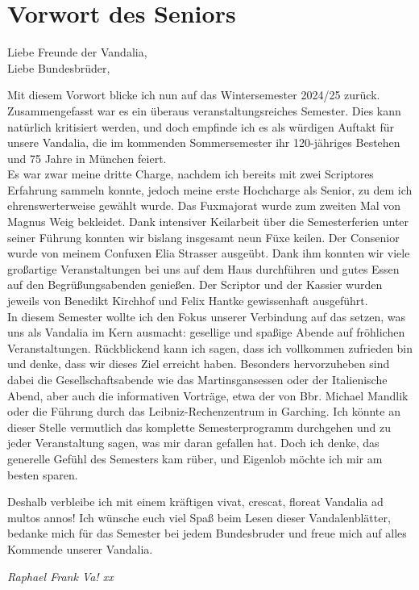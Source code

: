 \section{Vorwort des Seniors}

Liebe Freunde der Vandalia,\\
Liebe Bundesbrüder,
\begin{multicols}{2}

Mit diesem Vorwort blicke ich nun auf das Wintersemester 2024/25 zurück. Zusammengefasst
war es ein überaus veranstaltungsreiches Semester. Dies kann natürlich
kritisiert werden, und doch empfinde ich es als würdigen Auftakt für unsere
Vandalia, die im kommenden Sommersemester ihr 120-jähriges Bestehen und 75
Jahre in München feiert.\\
Es war zwar meine dritte Charge, nachdem ich bereits mit zwei Scriptores Erfahrung sammeln
konnte, jedoch meine erste Hochcharge als Senior, zu dem ich ehrenswerterweise
gewählt wurde. Das Fuxmajorat wurde zum zweiten Mal von Magnus Weig bekleidet.
Dank intensiver Keilarbeit über die Semesterferien unter seiner Führung konnten
wir bislang insgesamt neun Füxe keilen. Der Consenior wurde von meinem Confuxen
Elia Strasser ausgeübt. Dank ihm konnten wir viele großartige Veranstaltungen
bei uns auf dem Haus durchführen und gutes Essen auf den Begrüßungsabenden
genießen. Der Scriptor und der Kassier wurden jeweils von Benedikt Kirchhof und
Felix Hantke gewissenhaft ausgeführt.\\
In diesem
Semester wollte ich den Fokus unserer Verbindung auf das setzen, was uns als
Vandalia im Kern ausmacht: gesellige und spaßige Abende auf fröhlichen
Veranstaltungen. Rückblickend kann ich sagen, dass ich vollkommen zufrieden bin
und denke, dass wir dieses Ziel erreicht haben. Besonders hervorzuheben sind
dabei die Gesellschaftsabende wie das Martinsgansessen oder der Italienische
Abend, aber auch die informativen Vorträge, etwa der von Bbr. Michael Mandlik
oder die Führung durch das Leibniz-Rechenzentrum in Garching. Ich könnte an
dieser Stelle vermutlich das komplette Semesterprogramm durchgehen und zu jeder
Veranstaltung sagen, was mir daran gefallen hat. Doch ich denke, das generelle
Gefühl des Semesters kam rüber, und Eigenlob möchte ich mir am besten sparen.

Deshalb verbleibe ich mit einem kräftigen vivat, crescat, floreat Vandalia ad
multos annos! Ich wünsche euch viel Spaß beim Lesen dieser
Vandalenblätter, bedanke mich für das Semester bei jedem Bundesbruder und freue
mich auf alles Kommende unserer Vandalia.

	\begin{flushright}
		\hfill\emph{Raphael Frank Va! xx}
	\end{flushright}
\end{multicols}

